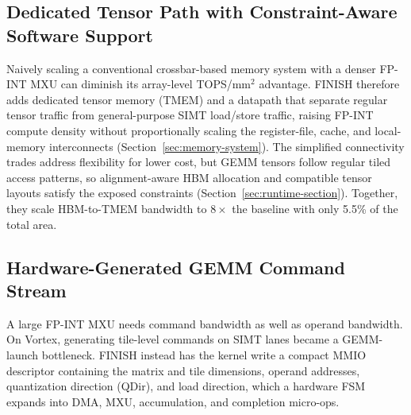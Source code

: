 \documentclass[sigconf,anonymous,nonacm]{acmart}
\newcommand{\ours}{\textsc{FINISH}}
\newcommand{\fpint}{FP-INT}
\begin{document}
\subsection{Dedicated Tensor Path with Constraint-Aware Software Support}
Naively scaling a conventional crossbar-based memory system with a denser \fpint{} MXU can diminish its array-level TOPS/mm$^2$ advantage. \ours{} therefore adds dedicated tensor memory (TMEM) and a datapath that separate regular tensor traffic from general-purpose SIMT load/store traffic, raising \fpint{} compute density without proportionally scaling the register-file, cache, and local-memory interconnects\cite{dissecting_hopper,virgo} (Section~\ref{sec:memory-system}). The simplified connectivity trades address flexibility for lower cost, but GEMM tensors follow regular tiled access patterns, so alignment-aware HBM allocation and compatible tensor layouts satisfy the exposed constraints (Section~\ref{sec:runtime-section}). Together, they scale HBM-to-TMEM bandwidth to $8\times$ the baseline with only 5.5\% of the total area.

\subsection{Hardware-Generated GEMM Command Stream}
A large \fpint{} MXU needs command bandwidth as well as operand bandwidth. 
On Vortex, generating tile-level commands on SIMT lanes became a GEMM-launch bottleneck. 
FINISH instead has the kernel write a compact MMIO descriptor containing the matrix and tile dimensions, operand addresses, quantization direction (QDir), and load direction, which a hardware FSM expands into DMA, MXU, accumulation, and completion micro-ops.
\end{document}
